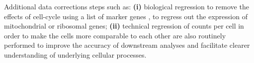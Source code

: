 Additional data corrections steps such as: \textbf{(i)} biological regression to remove the effects of cell-cycle using a list of marker genes  \textbf{\cite{macosko_highly_2015}}, to regress out the expression of mitochondrial or ribosomal genes; \textbf{(ii)} technical regression of counts per cell in order to make the cells more comparable to each other are also routinely performed to improve the accuracy of downstream analyses and facilitate clearer understanding of underlying cellular processes. 



